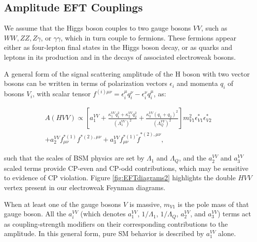 \subsection{Amplitude EFT Couplings} \label{sec:amplitudeEFT}

We assume that the Higgs boson couples to two gauge bosons $VV$, such as $WW, ZZ, Z\gamma$, or $\gamma\gamma$, which in turn couple to fermions. These fermions appear either as four-lepton final states in the Higgs boson decay, or as quarks and leptons in its production and in the decays of associated electroweak bosons.

A general form of the signal scattering amplitude of the H boson with two vector bosons can be written in terms of polarization vectors $\epsilon_i$ and momenta $q_i$ of bosons $V_i$, with scalar tensor $f^{(i){\mu \nu}} = \epsilon_{i}^{\mu}q_{i}^{\nu} - \epsilon_{i}^\nu q_{i}^{\mu}$, as:

\begin{equation}
\label{eq:formfact-fullampl-spin0}
\begin{gathered}
A(HVV)\propto
\left[ a_{1}^{VV}
+ \frac{\kappa_1^{VV}q_{1}^2 + \kappa_2^{VV} q_{2}^{2}}{\left(\Lambda_{1}^{VV} \right)^{2}}
+ \frac{\kappa_3^{VV}(q_{1} + q_{2})^{2}}{\left(\Lambda_{Q}^{VV} \right)^{2}}
\right]
m_{V1}^2 \epsilon_{V1}^* \epsilon_{V2}^* \\
+ a_{2}^{VV}  f_{\mu \nu}^{*(1)}f^{*(2),\mu\nu}
+ a_{3}^{VV}   f^{*(1)}_{\mu \nu} {\tilde f}^{*(2),\mu\nu},
\end{gathered}
\end{equation}

such that the scales of BSM physics are set by $\Lambda_{1}$ and $\Lambda_{Q}$, and the $a_{2}^{VV}$ and $a_{3}^{VV}$ scaled terms provide CP-even and CP-odd contributions, which may be sensitive to evidence of CP violation. Figure \ref{fig:EFTdiagrams2} highlights the double $HVV$ vertex present in our electroweak Feynman diagrams.

When at least one of the gauge bosons $V$ is massive, $m_{V1}$ is the pole mass of that gauge boson. All the $a_i^{VV}$ (which denotes $a_{1}^{VV}$, $1/\Lambda_{1}$, $1/\Lambda_{Q}$, $a_{2}^{VV}$, and $a_{3}^{VV}$) terms act as coupling-strength modifiers on their corresponding contributions to the amplitude. In this general form, pure SM behavior is described by $a_{1}^{VV}$ alone.


